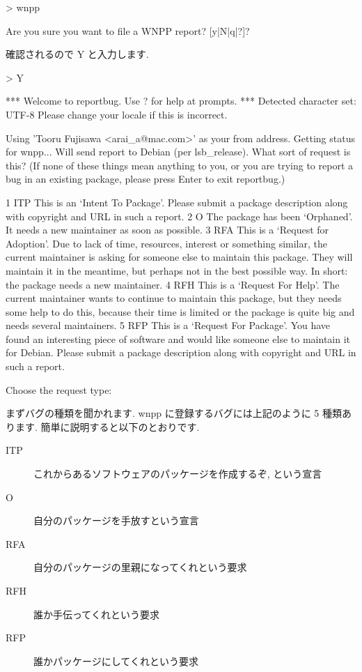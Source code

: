 \documentclass[mingoth,a4paper]{jsarticle}
\begin{document}
\begin{commandline}
\begin{commandline}
> wnpp

Are you sure you want to file a WNPP report? [y|N|q|?]?
\end{commandline}

確認されるので Y と入力します.

\begin{commandline}
> Y

*** Welcome to reportbug.  Use ? for help at prompts. ***
Detected character set: UTF-8
Please change your locale if this is incorrect.

Using 'Tooru Fujisawa <arai_a@mac.com>' as your from address.
Getting status for wnpp...
Will send report to Debian (per lsb_release).
What sort of request is this? (If none of these things mean anything to you, or
you are trying to report a bug in an existing package, please press Enter to
exit reportbug.)

1 ITP  This is an `Intent To Package'. Please submit a package description
       along with copyright and URL in such a report.
2 O    The package has been `Orphaned'. It needs a new maintainer as soon as
       possible.
3 RFA  This is a `Request for Adoption'. Due to lack of time, resources,
       interest or something similar, the current maintainer is asking for
       someone else to maintain this package. They will maintain it in the
       meantime, but perhaps not in the best possible way. In short: the
       package needs a new maintainer.
4 RFH  This is a `Request For Help'. The current maintainer wants to continue
       to maintain this package, but they needs some help to do this, because
       their time is limited or the package is quite big and needs several
       maintainers.
5 RFP  This is a `Request For Package'. You have found an interesting piece of
       software and would like someone else to maintain it for Debian. Please
       submit a package description along with copyright and URL in such a
       report.

Choose the request type: 
\end{commandline}

まずバグの種類を聞かれます. wnpp に登録するバグには上記のように 5 種類あります.
簡単に説明すると以下のとおりです.

\begin{description}
 \item[ITP] これからあるソフトウェアのパッケージを作成するぞ, という宣言
 \item[O] 自分のパッケージを手放すという宣言
 \item[RFA] 自分のパッケージの里親になってくれという要求
 \item[RFH] 誰か手伝ってくれという要求
 \item[RFP] 誰かパッケージにしてくれという要求
\end{description}


\end{commandline}
\end{document}

